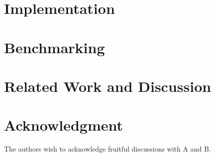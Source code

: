 \documentclass{lmcs} %
\theoremstyle{plain}\newtheorem{satz}[thm]{Satz} %
\begin{document}
\section{Implementation}\label{sec:impl}

\section{Benchmarking}\label{sec:bench}


\section{Related Work and Discussion}


\section*{Acknowledgment}
  \noindent The authors wish to acknowledge fruitful discussions with
  A and B.




\end{document}
